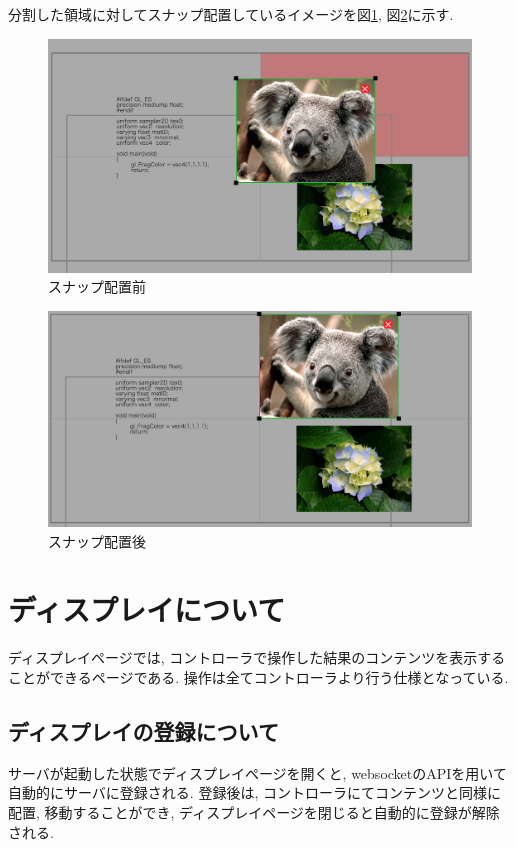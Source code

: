 \documentclass[a4paper,10pt,oneside]{jsbook}
\begin{document}
分割した領域に対してスナップ配置しているイメージを図\ref{fig:fitbefore}, 図\ref{fig:fitafter}に示す. 


\begin{figure}[htbp]
	\begin{center}
		\includegraphics[width=11.5cm]{image/fitbefore.png}
	\end{center}
	\caption{スナップ配置前}
	\label{fig:fitbefore}
\end{figure}

\begin{figure}[htbp]
	\begin{center}
		\includegraphics[width=11.5cm]{image/fitafter.png}
	\end{center}
	\caption{スナップ配置後}
	\label{fig:fitafter}
\end{figure}

\chapter{ディスプレイについて}
ディスプレイページでは, コントローラで操作した結果のコンテンツを表示することができるページである. 操作は全てコントローラより行う仕様となっている.

\section{ディスプレイの登録について}
サーバが起動した状態でディスプレイページを開くと, websocketのAPIを用いて自動的にサーバに登録される. 登録後は, コントローラにてコンテンツと同様に配置, 移動することができ, ディスプレイページを閉じると自動的に登録が解除される. 
\end{document}

